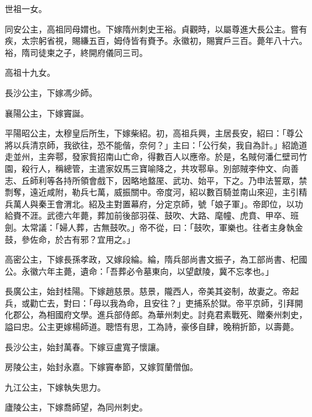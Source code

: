 
\begin{pinyinscope}

 世祖一女。



 同安公主，高祖同母媦也。下嫁隋州刺史王裕。貞觀時，以屬尊進大長公主。嘗有疾，太宗躬省視，賜縑五百，姆侍皆有賚予。永徽初，賜實戶三百。薨年八十六。裕，隋司徒柬之子，終開府儀同三司。



 高祖十九女。



 長沙公主，下嫁馮少師。



 襄陽公主，下嫁竇誕。



 平陽昭公主，太穆皇后所生，下嫁柴紹。初，高祖兵興，主居長安，紹曰：「尊公將以兵清京師，我欲往，恐不能偕，奈何？」主曰：「公行矣，我自為計。」紹詭道走並州，主奔鄠，發家貲招南山亡命，得數百人以應帝。於是，名賊何潘仁壁司竹園，殺行人，稱總管，主遣家奴馬三寶喻降之，共攻鄠阜。別部賊李仲文、向善志、丘師利等各持所領會戲下，因略地盩厔、武功、始平，下之。乃申法誓眾，禁剽奪，遠近咸附，勒兵七萬，威振關中。帝度河，紹以數百騎並南山來迎，主引精兵萬人與秦王會渭北。紹及主對置幕府，分定京師，號「娘子軍」。帝即位，以功給賚不涯。武德六年薨，葬加前後部羽葆、鼓吹、大路、麾幢、虎賁、甲卒、班劍。太常議：「婦人葬，古無鼓吹。」帝不從，曰：「鼓吹，軍樂也。往者主身執金鼓，參佐命，於古有邪？宜用之。」



 高密公主，下嫁長孫孝政，又嫁段綸。綸，隋兵部尚書文振子，為工部尚書、杞國公。永徽六年主薨，遺命：「吾葬必令墓東向，以望獻陵，冀不忘孝也。」



 長廣公主，始封桂陽。下嫁趙慈景。慈景，隴西人，帝美其姿制，故妻之。帝起兵，或勸亡去，對曰：「母以我為命，且安往？」吏捕系於獄。帝平京師，引拜開化郡公，為相國府文學。進兵部侍郎。為華州刺史。討堯君素戰死、贈秦州刺史，謚曰忠。公主更嫁楊師道。聰悟有思，工為詩，豪侈自肆，晚稍折節，以壽薨。



 長沙公主，始封萬春。下嫁豆盧寬子懷讓。



 房陵公主，始封永嘉。下嫁竇奉節，又嫁賀蘭僧伽。



 九江公主，下嫁執失思力。



 廬陵公主，下嫁喬師望，為同州刺史。




\end{pinyinscope}

